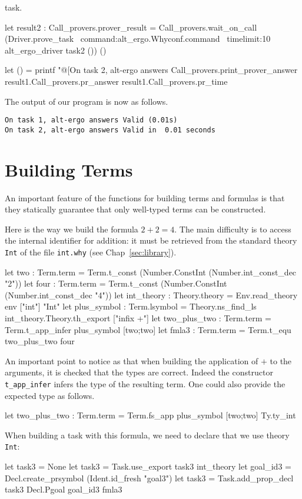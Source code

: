 task.
\begin{ocamlcode}
let result2 : Call_provers.prover_result =
   Call_provers.wait_on_call
    (Driver.prove_task ~command:alt_ergo.Whyconf.command
    ~timelimit:10
    alt_ergo_driver task2 ()) ()

let () =
  printf "@[On task 2, alt-ergo answers %
    Call_provers.print_prover_answer
    result1.Call_provers.pr_answer
    result1.Call_provers.pr_time
\end{ocamlcode}
The output of our program is now as follows.
\begin{verbatim}
On task 1, alt-ergo answers Valid (0.01s)
On task 2, alt-ergo answers Valid in  0.01 seconds
\end{verbatim}

\section{Building Terms}

An important feature of the functions for building terms and formulas
is that they statically guarantee that only well-typed terms can be
constructed.

Here is the way we build the formula $2+2=4$. The main difficulty is to
access the internal identifier for addition: it must be retrieved from
the standard theory \texttt{Int} of the file \texttt{int.why} (see
Chap~\ref{sec:library}).
\begin{ocamlcode}
let two : Term.term =
  Term.t_const (Number.ConstInt (Number.int_const_dec "2"))
let four : Term.term =
  Term.t_const (Number.ConstInt (Number.int_const_dec "4"))
let int_theory : Theory.theory =
  Env.read_theory env ["int"] "Int"
let plus_symbol : Term.lsymbol =
  Theory.ns_find_ls int_theory.Theory.th_export ["infix +"]
let two_plus_two : Term.term =
  Term.t_app_infer plus_symbol [two;two]
let fmla3 : Term.term = Term.t_equ two_plus_two four
\end{ocamlcode}
An important point to notice as that when building the application of
$+$ to the arguments, it is checked that the types are correct. Indeed
the constructor \texttt{t\_app\_infer} infers the type of the resulting
term. One could also provide the expected type as follows.
\begin{ocamlcode}
let two_plus_two : Term.term =
  Term.fs_app plus_symbol [two;two] Ty.ty_int
\end{ocamlcode}

When building a task with this formula, we need to declare that we use
theory \texttt{Int}:
\begin{ocamlcode}
let task3 = None
let task3 = Task.use_export task3 int_theory
let goal_id3 = Decl.create_prsymbol (Ident.id_fresh "goal3")
let task3 = Task.add_prop_decl task3 Decl.Pgoal goal_id3 fmla3
\end{ocamlcode}

